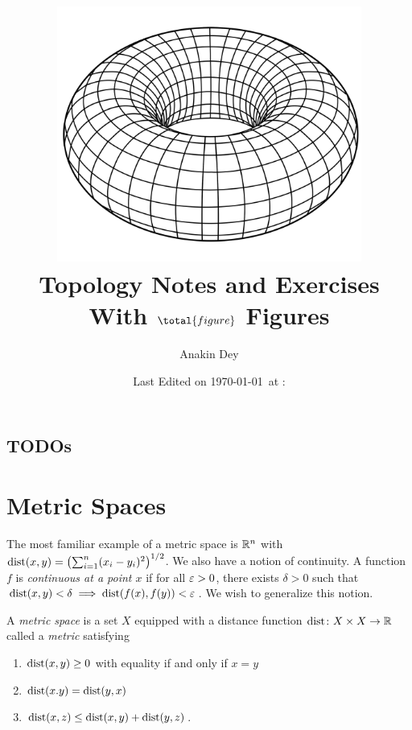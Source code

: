 \documentclass[letterpaper, 11pt, oneside]{book}
\title{\vspace{-100pt}\includegraphics[width=0.75\textwidth]{figs/title.png} \\ {\Huge Topology Notes and Exercises} \\ {\small With $\total{figure}$ Figures}}
\author{\Large Anakin Dey}
\date{\small Last Edited on \today\ at \DTMfetchhour{now}:\DTMfetchminute{now}}
\newcommand{\CoverName}{Cover}
\begin{document}
\frontmatter
\renewcommand{\thepage}{\CoverName}
\maketitle


\section*{TODOs}







\tableofcontents
\clearpage


\listoftheorems[ignoreall, show={defn}, title={List of Definitions}]

\listoftheorems[ignoreall, show={ex}, title={List of Examples and Counterexamples}]

\mainmatter

\chapter{Metric Spaces}

The most familiar example of a metric space is $\mathbb{R}^{n}$ with $\dist(x, y) = \pqty{\sum_{i = 1}^{n} (x_{i} - y_{i})^{2}}^{1/2}$.
We also have a notion of continuity.
A function $f$ is \emph{continuous at a point $x$} if for all $\varepsilon > 0$, there exists $\delta > 0$ such that $\operatorname{dist}(x, y) < \delta \implies \operatorname{dist}(f(x), f(y)) < \varepsilon$.
We wish to generalize this notion.

\begin{defn}
  A \emph{metric space} is a set $X$ equipped with a distance function $\operatorname{dist}\colon X \times X \to \mathbb{R}$ called a \emph{metric} satisfying
  \begin{enumerate}
    \item $\operatorname{dist}(x, y) \geq 0$ with equality if and only if $x = y$
    \item $\operatorname{dist}(x. y) = \operatorname{dist}(y, x)$
    \item $\operatorname{dist}(x, z) \leq \operatorname{dist}(x, y) + \operatorname{dist}(y, z)$.
  \end{enumerate}
\end{defn}
\end{document}

